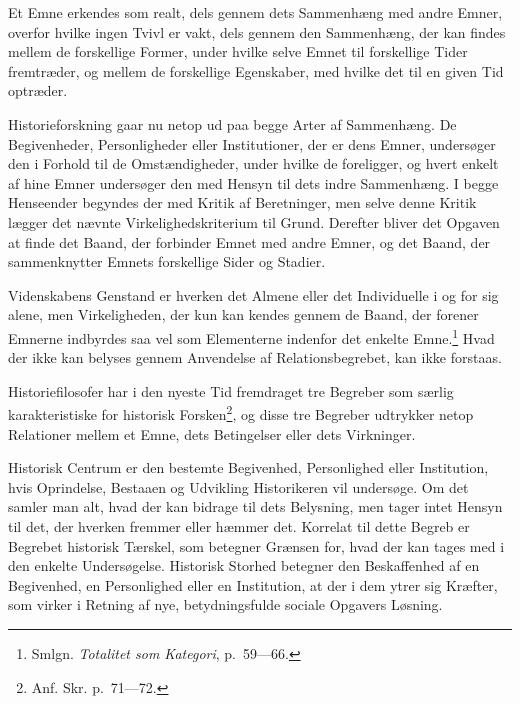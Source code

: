 \documentclass[12pt]{article}
\newcommand{\opage}[1]{\marginnote{\footnotesize\textit{[#1]}}}
\begin{document}
Et Emne erkendes som realt, dels gennem dets Sammenhæng med andre
Emner, overfor hvilke ingen Tvivl er vakt, dels gennem den Sammenhæng,
der kan findes mellem de forskellige Former, under hvilke selve Emnet
til forskellige Tider fremtræder, og mellem de forskellige Egenskaber,
med hvilke det til en given Tid optræder.

Historieforskning gaar nu netop ud paa begge Arter af Sammenhæng. De
Begivenheder, Personligheder eller Institutioner, der er dens Emner,
undersøger den i Forhold til de Omstændigheder, under hvilke de
foreligger, og hvert
\opage{79} \setcounter{footnote}{0}
enkelt af hine Emner undersøger den med Hensyn til dets indre
Sammenhæng. I begge Henseender begyndes der med Kritik af Beretninger,
men selve denne Kritik lægger det nævnte Virkelighedskriterium til
Grund. Derefter bliver det Opgaven at finde det Baand, der forbinder
Emnet med andre Emner, og det Baand, der sammenknytter Emnets
forskellige Sider og Stadier.

Videnskabens Genstand er hverken det Almene eller det Individuelle i og
for sig alene, men Virkeligheden, der kun kan kendes gennem de Baand,
der forener Emnerne indbyrdes saa vel som Elementerne indenfor det
enkelte Emne.\footnote{Smlgn. \textit{Totalitet som Kategori}, p.~59---66.}
Hvad der ikke kan belyses gennem Anvendelse af Relationsbegrebet, kan
ikke forstaas.

Historiefilosofer har i den nyeste Tid fremdraget tre Begreber som
særlig karakteristiske for historisk Forsken\footnote{Anf. Skr.
p.~71---72.}, og disse tre Begreber udtrykker netop Relationer mellem et
Emne, dets Betingelser eller dets Virkninger.

Historisk Centrum er den bestemte Begivenhed, Personlighed eller
Institution, hvis Oprindelse, Bestaaen og Udvikling Historikeren vil
undersøge. Om det samler man alt, hvad der kan bidrage til dets
Belysning, men tager intet Hensyn til det, der hverken fremmer eller
hæmmer det. Korrelat til dette Begreb er Begrebet historisk Tærskel, som
betegner Grænsen for, hvad der kan tages med i den enkelte Undersøgelse.
Historisk Storhed betegner den Beskaffenhed af en Begivenhed, en
Personlighed eller en Institution, at der i dem ytrer sig Kræfter, som
virker i Retning af nye, betydningsfulde sociale Opgavers Løsning.
\end{document}
